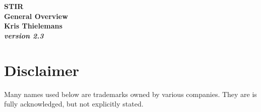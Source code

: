\documentclass{article}
\begin{document}
\begin{center}

\begin{spacing}{1.5}
\textbf{{\huge STIR \\
General Overview}}\\
\textbf{Kris Thielemans}\\
\textbf{\textit{version 2.3}}


\end{spacing}

\end{center}

\tableofcontents 


\section{
Disclaimer}
Many names used below are trademarks owned by various companies. They are
is fully acknowledged, but not explicitly stated.
\end{document}
